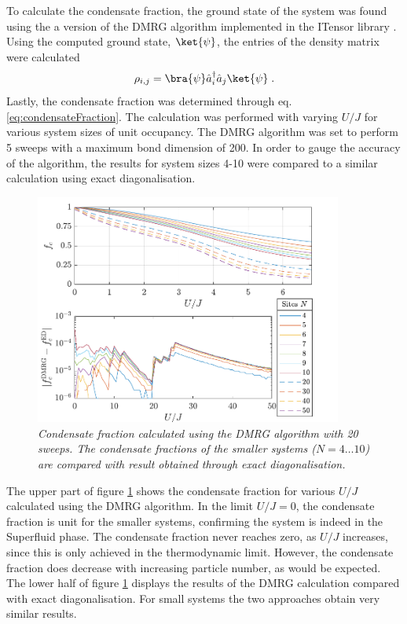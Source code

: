 To calculate the condensate fraction, the ground state of the system was found using the a version of the DMRG algorithm implemented in the ITensor library \cite{ITensor}. Using the computed ground state, $\ket{\psi}$, the entries of the density matrix were calculated
\begin{equation}
	\rho_{i,j} = \bra{\psi} \hat{a}_{i}^{\dag} \hat{a}_{j} \ket{\psi} \; .
\end{equation}
Lastly, the condensate fraction was determined through eq. \eqref{eq:condensateFraction}.
The calculation was performed with varying $U/J$ for various system sizes of unit occupancy. The DMRG algorithm was set to perform 5 sweeps with a maximum bond dimension of 200.
In order to gauge the accuracy of the algorithm, the results for system sizes 4-10 were compared to a similar calculation using exact diagonalisation.
\begin{figure}[h!]
    \centering
    \includegraphics[width=0.9\textwidth]{Figures/CondensateFractionCompare.pdf}
 \caption{\textit{Condensate fraction calculated using the DMRG algorithm with 20 sweeps. The condensate fractions of the smaller systems ($N = 4 \ldots 10$) are compared with result obtained through exact diagonalisation.}}
 \label{fig:CondensateFraction}
\end{figure}
The upper part of figure \ref{fig:CondensateFraction} shows the condensate fraction for various $U/J$ calculated using the DMRG algorithm. In the limit $U/J = 0$, the condensate fraction is unit for the smaller systems, confirming the system is indeed in the Superfluid phase. The condensate fraction never reaches zero, as $U/J$ increases, since this is only achieved in the thermodynamic limit. However, the condensate fraction does decrease with increasing particle number, as would be expected. The lower half of figure \ref{fig:CondensateFraction}  displays the results of the DMRG calculation compared with exact diagonalisation. For small systems the two approaches obtain very similar results.\\
